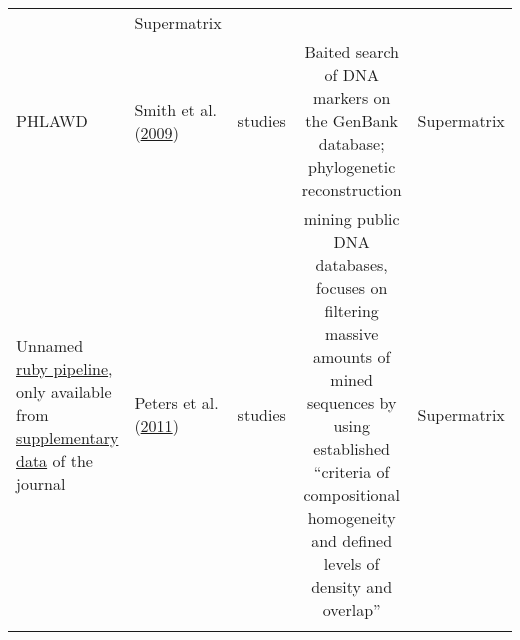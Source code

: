 \documentclass[]{article}
\begin{document}
\begin{longtable}[]{@{}llccc@{}}
\begin{minipage}[t]{0.20\columnwidth}
\end{minipage} & \begin{minipage}[t]{0.20\columnwidth}\centering
Supermatrix\strut
\end{minipage}\tabularnewline
\begin{minipage}[t]{0.12\columnwidth}\raggedright
PHLAWD\strut
\end{minipage} & \begin{minipage}[t]{0.15\columnwidth}\raggedright
Smith et al. (\protect\hyperlink{ref-smith2009mega}{2009})\strut
\end{minipage} & \begin{minipage}[t]{0.20\columnwidth}\centering
234 studies\strut
\end{minipage} & \begin{minipage}[t]{0.20\columnwidth}\centering
Baited search of DNA markers on the GenBank database; phylogenetic reconstruction\strut
\end{minipage} & \begin{minipage}[t]{0.20\columnwidth}\centering
Supermatrix\strut
\end{minipage}\tabularnewline
\begin{minipage}[t]{0.12\columnwidth}\raggedright
Unnamed \href{https://www.zfmk.de/en/research/research-centres-and-groups/taming-of-an-impossible-child-pipeline-tools-and-manuals}{ruby pipeline}, only available from \href{https://static-content.springer.com/esm/art\%3A10.1186\%2F1741-7007-9-55/MediaObjects/12915_2011_480_MOESM1_ESM.ZIP}{supplementary data} of the journal\strut
\end{minipage} & \begin{minipage}[t]{0.15\columnwidth}\raggedright
Peters et al. (\protect\hyperlink{ref-peters2011taming}{2011})\strut
\end{minipage} & \begin{minipage}[t]{0.20\columnwidth}\centering
64 studies\strut
\end{minipage} & \begin{minipage}[t]{0.20\columnwidth}\centering
mining public DNA databases, focuses on filtering massive amounts of mined sequences by using established ``criteria of compositional homogeneity and defined levels of density and overlap''\strut
\end{minipage} & \begin{minipage}[t]{0.20\columnwidth}\centering
Supermatrix\strut
\end{minipage}\tabularnewline
\begin{minipage}[t]{0.12\columnwidth}\raggedright

\end{minipage}
\end{longtable}
\end{document}
